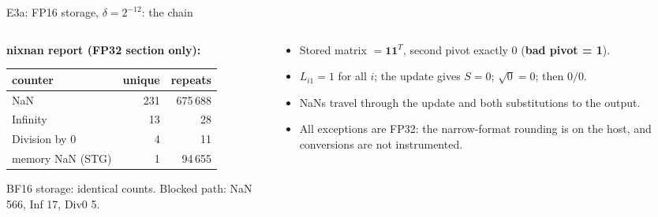 \documentclass[aspectratio=169,10pt,xcolor=table]{beamer}
\begin{document}
\begin{frame}{E3a: FP16 storage, $\delta=2^{-12}$: the chain}
\footnotesize
{}

\vspace{3mm}
\begin{columns}[T]\begin{column}{0.52\textwidth}
\textbf{nixnan report (FP32 section only):}\\[1mm]
\begin{tabular}{lrr}
\toprule
counter & unique & repeats\\
\midrule
NaN & 231 & 675\,688\\
Infinity & 13 & 28\\
Division by 0 & 4 & 11\\
memory NaN (STG) & 1 & 94\,655\\
\bottomrule
\end{tabular}

\vspace{2mm}
BF16 storage: identical counts. Blocked path: NaN 566, Inf 17, Div0 5.
\end{column}\begin{column}{0.44\textwidth}
\begin{itemize}
\item Stored matrix $=\mathbf{1}\mathbf{1}^T$, second pivot exactly 0 (\textbf{bad pivot = 1}).
\item $L_{i1}=1$ for all $i$; the update gives $S=0$; $\sqrt0=0$; then $0/0$.
\item NaNs travel through the update and both substitutions to the output.
\item All exceptions are FP32: the narrow-format rounding is on the host, and conversions are not instrumented.
\end{itemize}
\end{column}\end{columns}
\end{frame}
\end{document}
